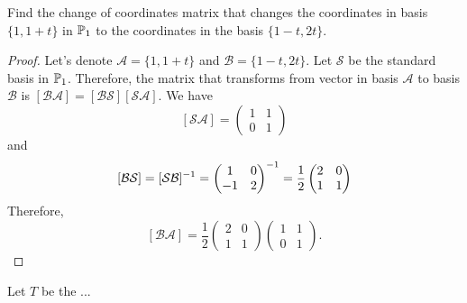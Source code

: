 \documentclass{article}
\begin{document}
\begin{exercise}
  Find the change of coordinates matrix that changes the 
  coordinates in basis $\{1,1+t\}$ in $\P_1$ to the 
  coordinates in the basis $\{1-t, 2t\}$.
\end{exercise}
\begin{proof}
  Let's denote $\mathcal{A}=\{1,1+t\}$ and 
  $\mathcal{B}=\{1-t, 2t\}$. Let $\mathcal{S}$
  be the standard basis in $\P_1$. Therefore, 
  the matrix that transforms from vector in basis
  $\mathcal{A}$ to basis $\mathcal{B}$ is 
  $[\mathcal{BA}]= [\mathcal{BS}][\mathcal{SA}]$.
  We have
  \[ [\mathcal{SA}] = \begin{pmatrix} 1 &1 \\ 0 &1 \end{pmatrix} \]
  and 
  \[
    [\mathcal{BS}]=[\mathcal{SB}]^{-1}=
    \begin{pmatrix} 1  & 0\\ -1 & 2 \end{pmatrix}^{-1}=\frac{1}{2}
    \begin{pmatrix} 2 &0\\ 1 &1 \end{pmatrix}
  \]
  Therefore, 
  \[
    [\mathcal{BA}]= \frac{1}{2}
    \begin{pmatrix} 2 &0\\ 1 &1 \end{pmatrix}
    \begin{pmatrix} 1 &1 \\ 0 &1 \end{pmatrix}.
  \]
\end{proof}
\begin{exercise}
  Let $T$ be the ...
\end{exercise}
\end{document}
